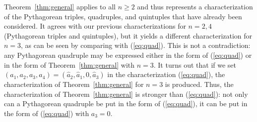 \documentclass[11pt]{article}
\begin{document}
Theorem~\ref{thm:general} applies to all $n \geq 2$ and thus represents 
a characterization of the Pythagorean triples, quadruples, and quintuples
that have already been considered.
It agrees with our previous characterizations for $n=2,4$ (Pythagorean triples
and quintuples),
but it yields a different characterization for $n=3$, as can be seen 
by comparing with (\ref{eq:quad}).
This is not a contradiction: any Pythagorean quadruple
may be expressed either in the form of (\ref{eq:quad})
or in the form of Theorem~\ref{thm:general} with $n=3$.
%
It turns out that if we set 
$(a_1,a_2,a_3,a_4) = (\hat{a}_2, \hat{a}_1, 0, \hat{a}_3)$
in the characterization (\ref{eq:quad}),
the characterization of Theorem~\ref{thm:general} for $n=3$ is produced.
Thus, the characterization of Theorem~\ref{thm:general} is stronger than
(\ref{eq:quad}): not only can a Pythagorean quadruple
be put in the form of (\ref{eq:quad}), it can be put in the form
of (\ref{eq:quad}) with $a_3=0$.
\end{document}
